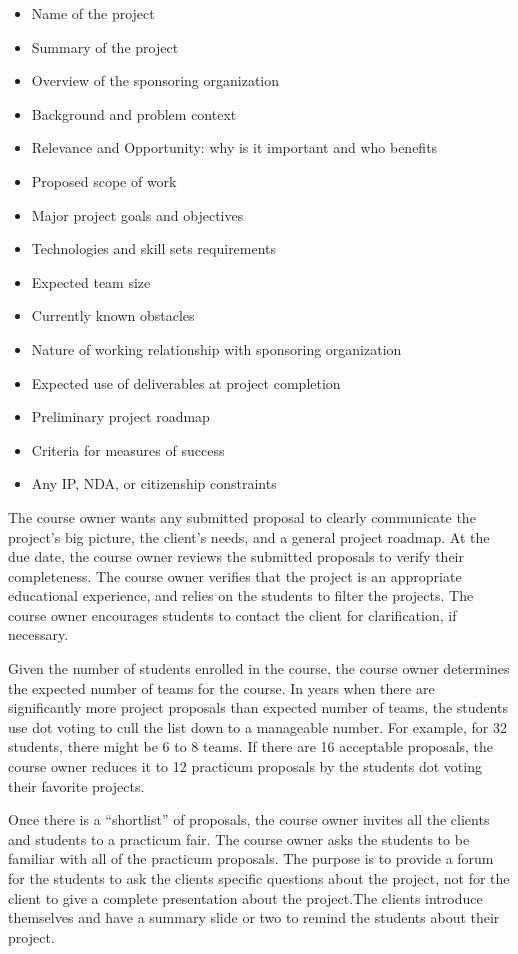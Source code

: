 \documentclass[conference]{IEEEtran}
\begin{document}
\begin{itemize}
\itemsep1pt\parskip0pt
\item
  {Name of the project}
\item
  {Summary of the project}
\item
  {Overview of the sponsoring organization}
\item
  {Background and problem context }
\item
  {Relevance and Opportunity: why is it important and who benefits}
\item
  {Proposed scope of work}
\item
  {Major project goals and objectives }
\item
  {Technologies and skill sets requirements }
\item
  {Expected team size }
\item
  {Currently known obstacles}
\item
  {Nature of working relationship with sponsoring organization}
\item
  {Expected use of deliverables at project completion}
\item
  {Preliminary project roadmap}
\item
  {Criteria for measures of success}
\item
  {Any IP, NDA, or citizenship constraints}
\end{itemize}

The course owner wants any submitted proposal to clearly communicate
the project's big picture, the client's needs, and a general project
roadmap. At the due date, the course owner reviews the submitted
proposals to verify their completeness. The course owner verifies that
the project is an appropriate educational experience, and relies on the
students to filter the projects. The course owner encourages
students to contact the client for clarification, if necessary.

Given the number of students enrolled in the course, the course owner
determines the expected number of teams for the course. In years when
there are significantly more project proposals than expected number of
teams, the students use dot voting to cull the list down to a manageable
number. For example, for 32 students, there might be 6 to 8 teams. If
there are 16 acceptable proposals, the course owner reduces it to 12
practicum proposals by the students dot voting their favorite projects.

Once there is a ``shortlist'' of proposals, the course owner invites
all the clients and students to a practicum fair. The course owner asks
the students to be familiar with all of the practicum proposals. The
purpose is to provide a forum for the students to ask the clients
specific questions about the project, not for the client to give a
complete presentation about the project.The clients introduce themselves
and have a summary slide or two to remind the students about their
project. 
\end{document}
